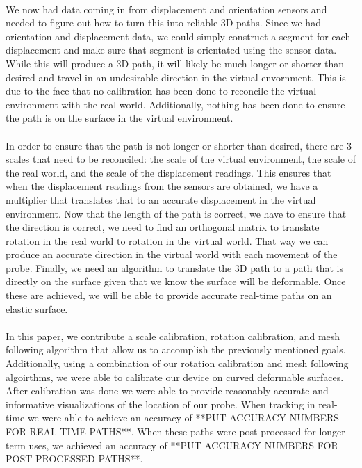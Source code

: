 \\
We now had data coming in from displacement and orientation sensors and needed to figure out how to turn this into reliable 3D paths. Since we had orientation and displacement data, we could simply construct a segment for each displacement and make sure that segment is orientated using the sensor data. While this will produce a 3D path, it will likely be much longer or shorter than desired and travel in an undesirable direction in the virtual envornment. This is due to the face that no calibration has been done to reconcile the virtual environment with the real world. Additionally, nothing has been done to ensure the path is on the surface in the virtual environment.\\
\\
In order to ensure that the path is not longer or shorter than desired, there are 3 scales that need to be reconciled: the scale of the virtual environment, the scale of the real world, and the scale of the displacement readings. This ensures that when the displacement readings from the sensors are obtained, we have a multiplier that translates that to an accurate displacement in the virtual environment. Now that the length of the path is correct, we have to ensure that the direction is correct, we need to find an orthogonal matrix to translate rotation in the real world to rotation in the virtual world. That way we can produce an accurate direction in the virtual world with each movement of the probe. Finally, we need an algorithm to translate the 3D path to a path that is directly on the surface given that we know the surface will be deformable. Once these are achieved, we will be able to provide accurate real-time paths on an elastic surface. \\
\\
In this paper, we contribute a scale calibration, rotation calibration, and mesh following algorithm that allow us to accomplish the previously mentioned goals. Additionally, using a combination of our rotation calibration and mesh following algoirthms, we were able to calibrate our device on curved deformable surfaces. After calibration was done we were able to provide reasonably accurate and informative visualizations of the location of our probe. When tracking in real-time we were able to achieve an accuracy of **PUT ACCURACY NUMBERS FOR REAL-TIME PATHS**. When these paths were post-processed for longer term uses, we achieved an accuracy of **PUT ACCURACY NUMBERS FOR POST-PROCESSED PATHS**.  